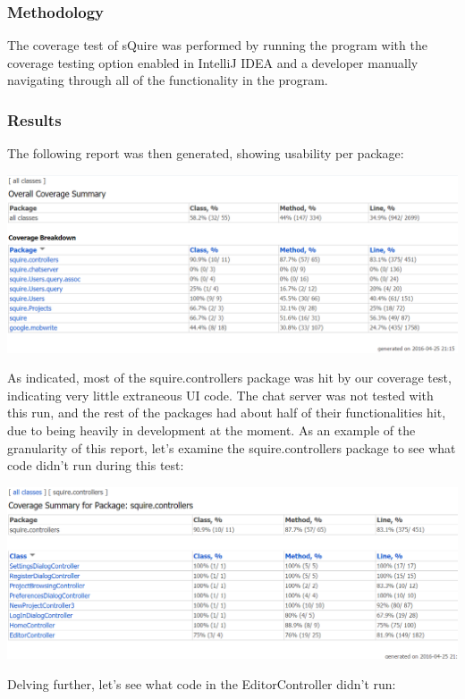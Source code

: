 \documentclass[twoside,letterpaper]{article}
\begin{document}
\subsubsection{Methodology}

The coverage test of sQuire was performed by running the program with the coverage testing option enabled in IntelliJ IDEA and a developer manually navigating through all of the functionality in the program.

\subsubsection{Results}

The following report was then generated, showing usability per package:

\noindent\includegraphics[width=\textwidth]{images/TestPlan/CoverageTest}

As indicated, most of the squire.controllers package was hit by our coverage test, indicating very little extraneous UI code. The chat server was not tested with this run, and the rest of the packages had about half of their functionalities hit, due to being heavily in development at the moment. As an example of the granularity of this report, let's examine the squire.controllers package to see what code didn't run during this test: 

\noindent\includegraphics[width=\textwidth]{images/TestPlan/ControllerCoverageTest}

\noindent Delving further, let's see what code in the EditorController didn't run: 
\end{document}
